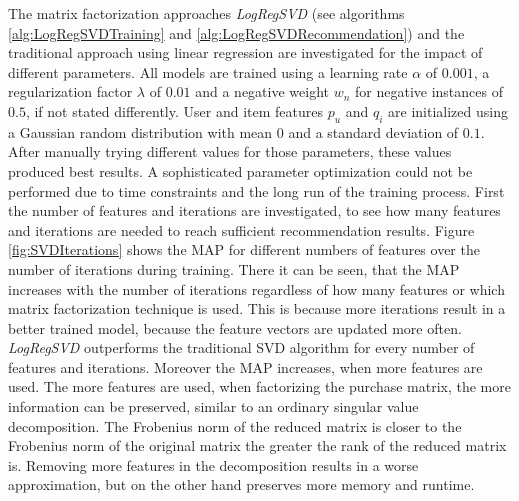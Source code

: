 \documentclass[10pt]{reportMaster}
\begin{document}
The matrix factorization approaches \textit{LogRegSVD} (see algorithms \ref{alg:LogRegSVDTraining} and \ref{alg:LogRegSVDRecommendation}) and the traditional approach using linear regression are investigated for the impact of different parameters.
All models are trained using a learning rate $\alpha$ of $0.001$, a regularization factor $\lambda$ of $0.01$ and a negative weight $w_n$ for negative instances of $0.5$, if not stated differently.
User and item features $p_u$ and $q_i$ are initialized using a Gaussian random distribution with mean 0 and a standard deviation of $0.1$.
After manually trying different values for those parameters, these values produced best results.
A sophisticated parameter optimization could not be performed due to time constraints and the long run of the training process.
First the number of features and iterations are investigated, to see how many features and iterations are needed to reach sufficient recommendation results.
Figure \ref{fig:SVDIterations} shows the MAP for different numbers of features over the number of iterations during training.
There it can be seen, that the MAP increases with the number of iterations regardless of how many features or which matrix factorization technique is used.
This is because more iterations result in a better trained model, because the feature vectors are updated more often.
\textit{LogRegSVD} outperforms the traditional SVD algorithm for every number of features and iterations.
Moreover the MAP increases, when more features are used.
The more features are used, when factorizing the purchase matrix, the more information can be preserved, similar to an ordinary singular value decomposition.
The Frobenius norm of the reduced matrix is closer to the Frobenius norm of the original matrix the greater the rank of the reduced matrix is.
Removing more features in the decomposition results in a worse approximation, but on the other hand preserves more memory and runtime.
\end{document}
